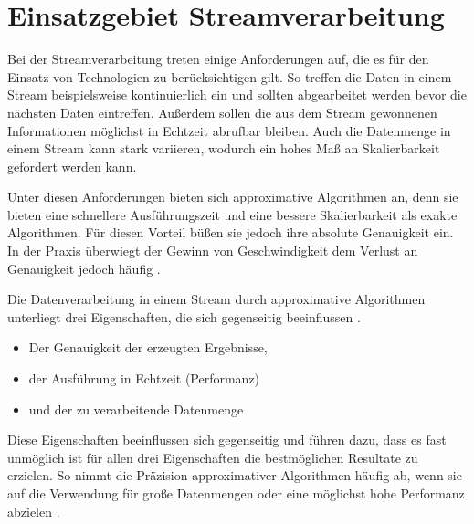 \section{Einsatzgebiet Streamverarbeitung}
Bei der Streamverarbeitung treten einige Anforderungen auf, die es für den Einsatz von Technologien zu berücksichtigen gilt. 
So treffen die Daten in einem Stream beispielsweise kontinuierlich ein und sollten abgearbeitet werden bevor die nächsten Daten eintreffen. 
Außerdem sollen die aus dem Stream gewonnenen Informationen möglichst in Echtzeit abrufbar bleiben.
Auch die Datenmenge in einem Stream kann stark variieren, wodurch ein hohes Maß an Skalierbarkeit gefordert werden kann.

Unter diesen Anforderungen bieten sich approximative Algorithmen an, denn sie bieten eine schnellere Ausführungszeit und eine bessere Skalierbarkeit als exakte Algorithmen. 
Für diesen Vorteil büßen sie jedoch ihre absolute Genauigkeit ein. 
In der Praxis überwiegt der Gewinn von Geschwindigkeit dem Verlust an Genauigkeit jedoch häufig \cite{Maas2019}. 

Die Datenverarbeitung in einem Stream durch approximative Algorithmen unterliegt drei Eigenschaften, die sich gegenseitig beeinflussen \cite{Maas2019}. 

\begin{itemize}
\item
Der Genauigkeit der erzeugten Ergebnisse,
\item
der Ausführung in Echtzeit (Performanz)
\item
und der zu verarbeitende Datenmenge
\end{itemize}

Diese Eigenschaften beeinflussen sich gegenseitig und führen dazu, dass es fast unmöglich ist für allen drei Eigenschaften die bestmöglichen Resultate zu erzielen.
So nimmt die Präzision approximativer Algorithmen häufig ab, wenn sie auf die Verwendung für große Datenmengen oder eine möglichst hohe Performanz abzielen \cite{Maas2019}.